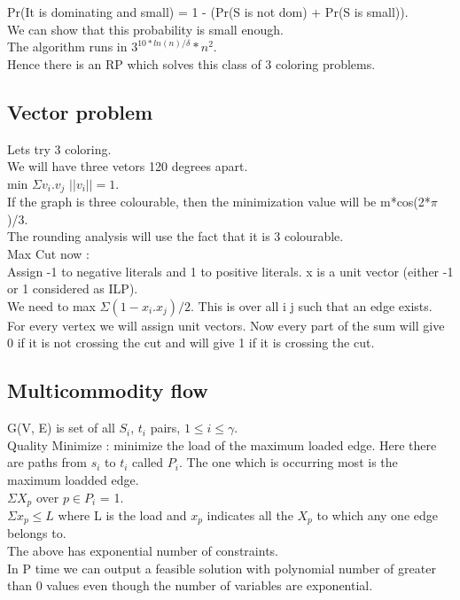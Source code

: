 \documentclass[solution,addpoints,12pt]{exam}
\begin{document}
Pr(It is dominating and small) = 1 - (Pr(S is not dom) + Pr(S is small)).\\
We can show that this probability is small enough.\\
The algorithm runs in $3^{10*ln(n)/\delta}*n^2$.\\
Hence there is an RP which solves this class of 3 coloring
problems.\\

\subsection{Vector problem}
Lets try 3 coloring.\\
We will have three vetors 120 degrees apart.\\
min $\Sigma v_i.v_j$ $||v_i|| = 1$.\\
If the graph is three colourable, then the minimization
value will be m*cos(2*$\pi$)/3.\\
The rounding analysis will use the fact that it is 3 colourable.\\

Max Cut now :\\
Assign -1 to negative literals and 1 to positive literals.
x is a unit vector (either -1 or 1 considered as ILP).\\
We need to max $\Sigma (1 - x_i.x_j)/2$.
This is over all i j such that an edge exists.
For every vertex we will assign unit vectors. Now
every part of the sum will give 0 if it is not crossing the cut
and will give 1 if it is crossing the cut.\\

\subsection{Multicommodity flow}
G(V, E) is set of all $S_i$, $t_i$ pairs, $1 \le i \le \gamma$.\\
Quality Minimize : minimize the load of the maximum loaded edge. Here
there are paths from $s_i$ to $t_i$ called $P_i$. The one
which is occurring most is the maximum loadded edge.\\
$\Sigma X_p$ over $p \in P_i$ = 1.\\
$\Sigma x_p \le L$ where L is the load and $x_p$ indicates
all the $X_p$ to which any one edge belongs to.\\
The above has exponential number of constraints.\\
In P time we can output a feasible solution with polynomial
number of greater than 0 values even though the number
of variables are exponential.\\
\end{document}
